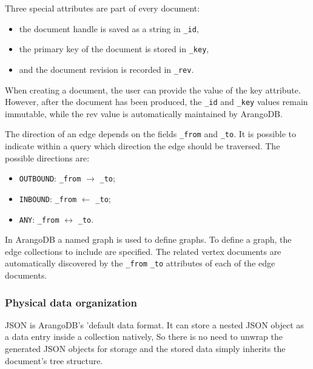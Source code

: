 Three special attributes are part of every document:
 \begin{itemize}[noitemsep]
	\item the document handle is saved as a string in \texttt{\_id},
	\item the primary key of the document is stored in \texttt{\_key},
	\item and the document revision is recorded in \texttt{\_rev}.
\end{itemize}
  
When creating a document, the user can provide the value of the key attribute.
However, after the document has been produced, the \texttt{\_id} and \texttt{\_key} values remain immutable, while the rev value is automatically maintained by ArangoDB.

The direction of an edge depends on the fields \texttt{\_from} and \texttt{\_to}.
It is possible to indicate within a query which direction the edge should be traversed. The possible directions are:
 \begin{itemize}[noitemsep]
	\item \texttt{OUTBOUND}: \texttt{\_from} $ \rightarrow $ \texttt{\_to};
	\item \texttt{INBOUND}: \texttt{\_from} $ \leftarrow $ \texttt{\_to};
	\item \texttt{ANY}: \texttt{\_from} $ \leftrightarrow $ \texttt{\_to}.
\end{itemize}

In ArangoDB a named graph is used to define graphs.
To define a graph, the edge collections to include are specified.
The related vertex documents are automatically discovered by the \texttt{\_from} \texttt{\_to} attributes of each of the edge documents.

\subsubsection{Physical data organization}\label{subsubsection:LiteratureReview/ReviewofGraphDatabaseSystems/AGDBMSindetailArangoDB/Physicaldataorganization}
JSON is ArangoDB's 'default data format.
It can store a nested JSON object as a data entry inside a collection natively,
So there is no need to unwrap the generated JSON objects for storage and the stored data simply inherits the document's tree structure.

